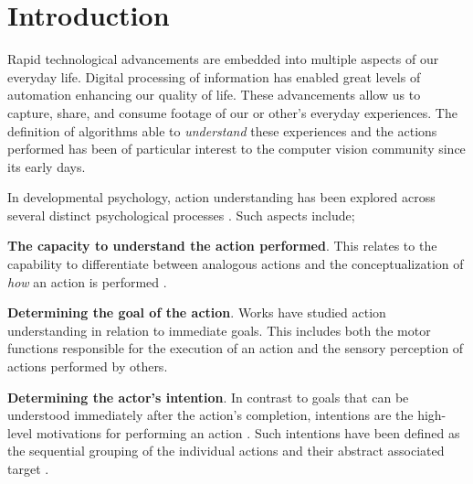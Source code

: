 \documentclass[smallextended,twocolumn,natbib]{svjour3}
\begin{document}



\section{Introduction}


Rapid technological advancements are embedded into multiple aspects of our everyday life.  Digital processing of information has enabled great levels of automation enhancing our quality of life. These advancements allow us to capture, share, and consume footage of our or other's everyday experiences. The definition of algorithms able to \emph{understand} these experiences and the actions performed has been of particular interest to the computer vision community since its early days. 



In developmental psychology, action understanding has been explored across several distinct psychological processes \citep{thompson2019conceptualizing}. Such aspects include; 

\noindent
\textbf{The capacity to understand the action performed}. This relates to the capability to differentiate between analogous actions \citep{gallese1996action,jeannerod1994representing} and the conceptualization of \emph{how} an action is performed \citep{spunt2011identifying}. 

\noindent
\textbf{Determining the goal of the action}. Works \citep{calvo2005action,kohler2002hearing,rizzolatti2001neurophysiological} have studied action understanding in relation to immediate goals. This includes both the motor functions responsible for the execution of an action and the sensory perception of actions performed by others. 

\noindent
\textbf{Determining the actor's intention}. In contrast to goals that can be understood immediately after the action's completion, intentions are the high-level motivations for performing an action \citep{kilner2011more}. Such intentions have been defined as the sequential grouping of the individual actions \citep{fogassi2005parietal} and their abstract associated target \citep{uithol2011understanding}.
\end{document}

